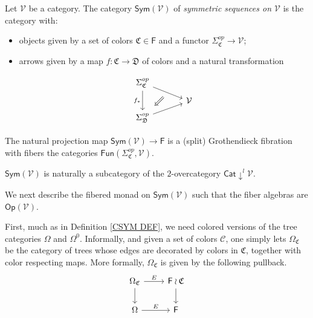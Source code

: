 \documentclass[a4paper,10pt
,draft
]{article}%
\renewcommand{\1}{\eta}%
\newcommand{\OC}{\Omega_{\mathfrak C}}
\begin{document}
\begin{definition}
Let $\mathcal{V}$ be a category.
The category $\mathsf{Sym}(\mathcal{V})$ of
\textit{symmetric sequences on $\mathcal{V}$} is the category with:
\begin{itemize}
\item objects given by a set of colors $\mathfrak{C} \in \mathsf{F}$
and a functor $\Sigma_{\mathfrak{C}}^{op} \to \mathcal{V}$;
\item arrows given by a map 
$f \colon \mathfrak{C} \to \mathfrak{D}$ of colors and a natural transformation

		\begin{equation}
		\begin{tikzcd}[row sep = tiny, column sep = 35pt]
			\Sigma_{\mathfrak{C}}^{op} \arrow{dr}[name=U]{} \arrow{dd}[swap]{f_{\**}}
		\\
			& \mathcal{V}
		\\
			|[alias=V]| \Sigma_{\mathfrak{D}}^{op} \arrow{ur}[swap]{}
		\arrow[Leftarrow, from=V, to=U,shorten >=0.25cm,shorten <=0.25cm
		,swap
		]
		\end{tikzcd}
		\end{equation}
\end{itemize}
\end{definition}


\begin{remark} The natural projection map
$\mathsf{Sym}(\mathcal{V}) \to \mathsf{F}$
is a (split) Grothendieck fibration with fibers the categories
$\mathsf{Fun}(\Sigma_{\mathfrak{C}}^{op},\mathcal{V})$.
\end{remark}


\begin{remark}\label{SUBCATDOWNL REM}
$\mathsf{Sym}(\mathcal{V})$ is naturally a subcategory of the $2$-overcategory
$\mathsf{Cat}\downarrow^l \mathcal{V}$.
\end{remark}


We next describe the fibered monad on $\mathsf{Sym}(\mathcal{V})$ such that the fiber algebras are
$\mathsf{Op}(\mathcal{V})$.

First, much as in Definition \ref{CSYM DEF}, we need colored versions of the tree categories $\Omega$ and $\Omega^0$.
Informally, and given a set of colors $\mathcal{C}$, 
one simply lets $\Omega_{\mathfrak{C}}$
be the category of trees whose edges are decorated by colors in $\mathfrak{C}$, together with color respecting maps. More formally, $\Omega_{\mathfrak{C}}$ is given by the following pullback.
\begin{equation}
	\begin{tikzcd}
		\OC \arrow[d] \arrow[r, "E"] &
		\mathsf F \wr \mathfrak C \arrow[d]
\\
		\Omega \arrow[r, "E"] &
		\mathsf F
	\end{tikzcd}
\end{equation}
\end{document}
